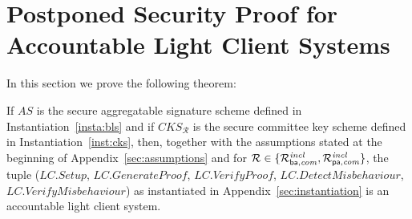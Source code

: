 \section{Postponed Security Proof for Accountable Light Client Systems}
\label{supplementary_proof_sec_accountability}

\noindent In this section we prove the following theorem:
\begingroup
\renewcommand{\thetheorem}{\ref{th:accountability_results}}
\begin{theorem} 
If $\mathit{AS}$ is the secure aggregatable signature scheme defined in Instantiation~\ref{insta:bls} and if 
$\mathit{CKS_{\mathcal{R}}}$ is the secure committee key scheme defined in Instantiation~\ref{inst:cks}, then, together 
with the assumptions stated at the beginning of Appendix~\ref{sec:assumptions} and for $\mathcal{R} \in \{ \mathcal{R}^{\mathit{incl}}_{\mathsf{ba},\mathit{com}}, \mathcal{R}^{\mathit{incl}}_{\mathsf{pa},\mathit{com}} \}$, the tuple 
($\mathit{LC.Setup}$, $\mathit{LC.GenerateProof}$, $\mathit{LC.VerifyProof}$, $\mathit{LC.DetectMisbehaviour}$, 
$\mathit{LC.VerifyMisbehaviour}$) as instantiated in Appendix~\ref{sec:instantiation} is an accountable light client system.
\end{theorem}
\addtocounter{theorem}{-1}
\endgroup
